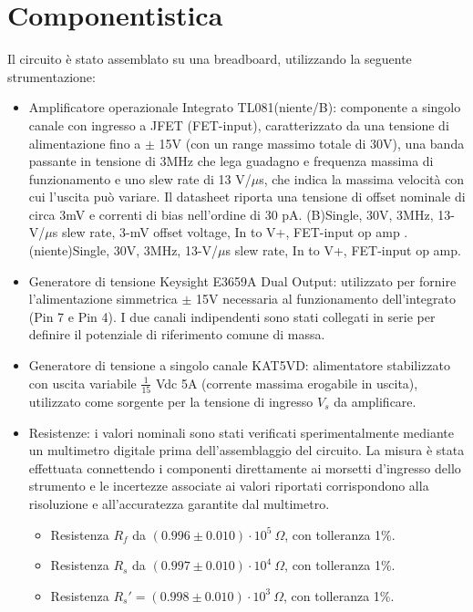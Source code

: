 \documentclass[a4paper, oneside]{article}
\begin{document}
\section{Componentistica}
Il circuito è stato assemblato su una breadboard, utilizzando la seguente strumentazione:
\begin{itemize}
    \item Amplificatore operazionale Integrato TL081(niente/B):
componente a singolo canale con ingresso a JFET (FET-input), caratterizzato da una tensione di alimentazione fino a
$\pm$ 15V (con un range massimo totale di 30V), una banda passante in tensione di 3MHz che lega guadagno e frequenza
massima di funzionamento e uno slew rate di 13 V/$\mu$s, che indica la massima velocità con cui l'uscita può variare.
Il datasheet riporta una tensione di offset nominale di circa 3mV e correnti di bias nell'ordine di 30 pA.
(B)Single, 30V, 3MHz, 13-V/$\mu$s slew rate, 3-mV offset voltage, In to V+, FET-input op amp . (niente)Single, 30V,
3MHz, 13-V/$\mu$s slew rate, In to V+, FET-input op amp.
    \item Generatore di tensione Keysight E3659A Dual Output:
utilizzato per fornire l'alimentazione simmetrica $\pm$ 15V necessaria al funzionamento dell'integrato (Pin 7 e Pin 4).
I due canali indipendenti sono stati collegati in serie per definire il potenziale di riferimento comune di massa.
\item Generatore di tensione a singolo canale KAT5VD:
alimentatore stabilizzato con uscita variabile $\frac{1}{15}$ Vdc 5A (corrente massima erogabile in uscita), utilizzato come
sorgente per la tensione di ingresso $V_s$ da amplificare.
\item Resistenze: i valori nominali sono stati verificati sperimentalmente mediante un multimetro digitale prima dell'assemblaggio del circuito. La misura è stata effettuata connettendo i componenti direttamente ai morsetti d'ingresso dello strumento e le incertezze associate ai valori riportati corrispondono alla risoluzione e all'accuratezza garantite dal multimetro.
\begin{itemize}
    \item Resistenza $R_f$ da $(0.996 \pm 0.010) \cdot 10 ^{5} \ \Omega$, con tolleranza 1\%.
    \item Resistenza $R_s$ da $(0.997 \pm 0.010) \cdot 10^{4} \ \Omega$, con tolleranza 1\%.
    \item Resistenza $R_s' = (0.998 \pm 0.010) \cdot 10^{3}\  \Omega$, con tolleranza 1\%.
\end{itemize}

\end{itemize}
\end{document}
